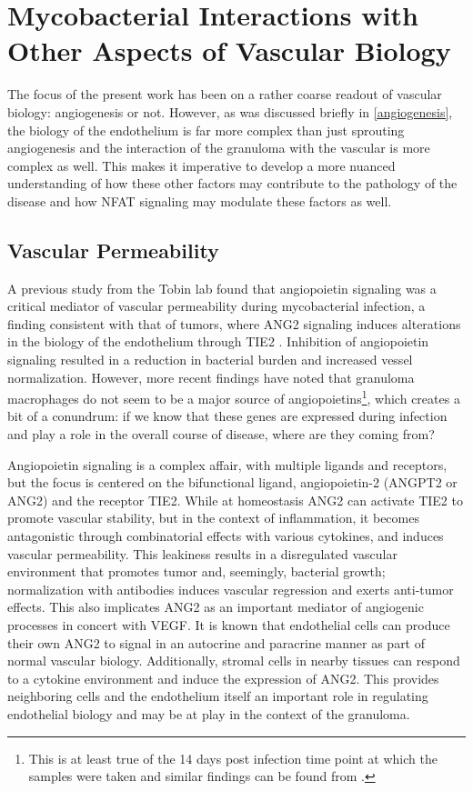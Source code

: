 \citep{Shiau2015} %

\section{Mycobacterial Interactions with Other Aspects of Vascular Biology}

The focus of the present work has been on a rather coarse readout of vascular biology: angiogenesis or not. However, as was discussed briefly in \autoref{angiogenesis}, the biology of the endothelium is far more complex than just sprouting angiogenesis and the interaction of the granuloma with the vascular is more complex as well. This makes it imperative to develop a more nuanced understanding of how these other factors may contribute to the pathology of the disease and how NFAT signaling may modulate these factors as well. 

\subsection{Vascular Permeability}

A previous study from the Tobin lab found that angiopoietin signaling was a critical mediator of vascular permeability during mycobacterial infection, a finding consistent with that of tumors, where ANG2 signaling induces alterations in the biology of the endothelium through TIE2 \citep{Oehlers2017, Duran2021, Goel2012}. Inhibition of angiopoietin signaling resulted in a reduction in bacterial burden and increased vessel normalization. However, more recent findings have noted that granuloma macrophages do not seem to be a major source of angiopoietins\footnote{This is at least true of the 14 days post infection time point at which the samples were taken and similar findings can be found from \citep{Gideon2022}.}, which creates a bit of a conundrum: if we know that these genes are expressed during infection and play a role in the overall course of disease, where are they coming from? \citep{Cronan2021} 

Angiopoietin signaling is a complex affair, with multiple ligands and receptors, but the focus is centered on the bifunctional ligand, angiopoietin-2 (ANGPT2 or ANG2) and the receptor TIE2. While at homeostasis ANG2 can activate TIE2 to promote vascular stability, but in the context of inflammation, it becomes antagonistic through combinatorial effects with various cytokines, and induces vascular permeability. This leakiness results in a disregulated vascular environment that promotes tumor and, seemingly, bacterial growth; normalization with antibodies induces vascular regression and exerts anti-tumor effects. This also implicates ANG2 as an important mediator of angiogenic processes in concert with VEGF. It is known that endothelial cells can produce their own ANG2 to signal in an autocrine and paracrine manner as part of normal vascular biology. Additionally, stromal cells in nearby tissues can respond to a cytokine environment and induce the expression of ANG2. This provides neighboring cells and the endothelium itself an important role in regulating endothelial biology and may be at play in the context of the granuloma.


